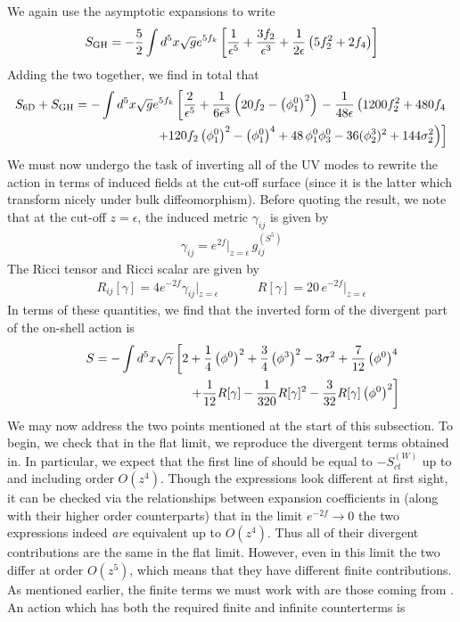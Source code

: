 \documentclass[12pt]{article}
\begin{document}
We again use the asymptotic expansions to write 
\begin{eqnarray}
S_{\mathrm{GH}} = -{5 \over 2} \int d^5 x \sqrt{g} e^{5 f_k} \left[{1 \over \epsilon^5} +{3 f_2\over \epsilon^3} +{1 \over2 \epsilon} \left(5 f_2^2 + 2 f_4\right) \right]
\end{eqnarray}
Adding the two together, we find in total that 
\begin{eqnarray}
S_{\mathrm{6D}}+S_{\mathrm{GH}} = -\int d^5 x \sqrt{g} e^{5 f_k} \left[{2 \over \epsilon^5} +{1 \over 6 \epsilon^3}\left(20 f_2 - \left(\phi^0_1\right)^2 \right) \right.- {1 \over 48\epsilon}\left(1200 f_2^2 + 480 f_4  \right.  \nonumber\\
\vphantom{.}\hspace{0.2 in}\left. \left. \hspace{.5in} + 120 f_2 \left(\phi^0_1\right)^2 - \left(\phi^0_1\right)^4 + 48\, \phi^0_1 \phi^0_3 -36(\phi^3_2)^2 + 144 \sigma_2^2  \right)\right]
\end{eqnarray}
We must now undergo the task of inverting all of the UV modes to rewrite the action in terms of induced fields at the cut-off surface (since it is the latter which transform nicely under bulk diffeomorphism). Before quoting the result, we note that at the cut-off $z = \epsilon$, the induced metric $\gamma_{i j}$ is given by 
\begin{eqnarray}
\gamma_{i j}=  e^{2 f}\big|_{z = \epsilon} \,g^{(S^5)}_{i j}
\end{eqnarray}  
The Ricci tensor and Ricci scalar are given by
\begin{eqnarray}
R_{ij}[\gamma] = 4e^{-2f}\gamma_{ij}\big|_{z = \epsilon}~~~~~~~~~~~~~~R[\gamma] = 20 \,e^{- 2 f}\big|_{z = \epsilon}
\end{eqnarray}
In terms of these quantities, we find that the inverted form of the divergent part of the on-shell action is 
\begin{eqnarray}
S = - \int d^5 x \sqrt{\gamma} \left[2 + {1 \over 4} \left(\phi^0\right)^2 + {3 \over 4} \left(\phi^3\right)^2 - 3 \sigma^2 +{7 \over 12 }\left(\phi^0\right)^4\right.
\nonumber\\
\vphantom{.}\hspace{1.4 in}\left. + {1 \over 12} R[\gamma] - {1 \over 320} R[\gamma]^2 - {3 \over 32} R[\gamma] \left(\phi^0\right)^2 \right]
\end{eqnarray}
We may now address the two points mentioned at the start of this subsection. To begin, we check that in the flat limit, we reproduce the divergent terms obtained in. In particular, we expect that the first line of should be equal to $-S_{ct}^{(W)}$ up to and including order $O(z^4)$. Though the expressions look different at first sight, it can be checked via the relationships between expansion coefficients in  (along with their higher order counterparts) that in the limit $e^{-2f} \rightarrow 0$ the two expressions indeed \textit{are} equivalent up to $O(z^4)$. Thus all of their divergent contributions are the same in the flat limit. However, even in this limit the two differ at order $O(z^5)$, which means that they have different finite contributions. As mentioned earlier, the finite terms we must work with are those coming from . An action which has both the required finite and infinite counterterms is
\end{document}

